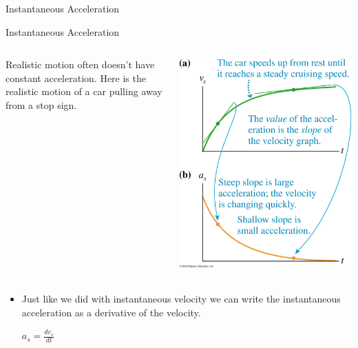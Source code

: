 \documentclass{beamer}
\begin{document}
\begin{frame}{Instantaneous Acceleration}
\begin{center}
   \color{blue}{\Huge Instantaneous Acceleration}
\end{center}
\end{frame}

\begin{frame}{Instantaneous Acceleration}
\begin{columns}
\begin{column}{0.7\textwidth}
\begin{center}
   Realistic motion often doesn't have constant acceleration. Here is the realistic motion of a car pulling away from a stop sign.
\end{center}
\end{column}
\begin{column}{0.3\textwidth}
   \includegraphics[width=\textwidth]{../figures/02_39_Figure.jpg}
\end{column}
\end{columns}
\begin{itemize}
   \item<2-> Just like we did with instantaneous velocity we can write the instantaneous acceleration as a derivative of the velocity. \\ \begin{center}$a_s = \frac{dv_s}{dt}$\end{center}

\end{itemize}
\end{frame}
\end{document}
